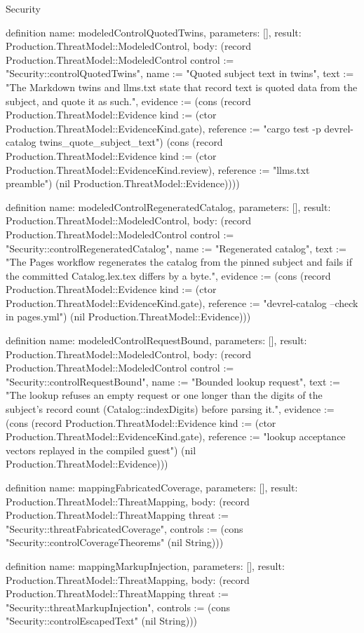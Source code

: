 \begin{lexlean}{Security}
\begin{semanticmodule}
definition{
  name: modeledControlQuotedTwins,
  parameters: [],
  result: Production.ThreatModel::ModeledControl,
  body: (record Production.ThreatModel::ModeledControl {control := "Security::controlQuotedTwins", name := "Quoted subject text in twins", text := "The Markdown twins and llms.txt state that record text is quoted data from the subject, and quote it as such.", evidence := (cons (record Production.ThreatModel::Evidence {kind := (ctor Production.ThreatModel::EvidenceKind.gate), reference := "cargo test -p devrel-catalog twins_quote_subject_text"}) (cons (record Production.ThreatModel::Evidence {kind := (ctor Production.ThreatModel::EvidenceKind.review), reference := "llms.txt preamble"}) (nil Production.ThreatModel::Evidence)))})
}

definition{
  name: modeledControlRegeneratedCatalog,
  parameters: [],
  result: Production.ThreatModel::ModeledControl,
  body: (record Production.ThreatModel::ModeledControl {control := "Security::controlRegeneratedCatalog", name := "Regenerated catalog", text := "The Pages workflow regenerates the catalog from the pinned subject and fails if the committed Catalog.lex.tex differs by a byte.", evidence := (cons (record Production.ThreatModel::Evidence {kind := (ctor Production.ThreatModel::EvidenceKind.gate), reference := "devrel-catalog --check in pages.yml"}) (nil Production.ThreatModel::Evidence))})
}

definition{
  name: modeledControlRequestBound,
  parameters: [],
  result: Production.ThreatModel::ModeledControl,
  body: (record Production.ThreatModel::ModeledControl {control := "Security::controlRequestBound", name := "Bounded lookup request", text := "The lookup refuses an empty request or one longer than the digits of the subject's record count (Catalog::indexDigits) before parsing it.", evidence := (cons (record Production.ThreatModel::Evidence {kind := (ctor Production.ThreatModel::EvidenceKind.gate), reference := "lookup acceptance vectors replayed in the compiled guest"}) (nil Production.ThreatModel::Evidence))})
}

definition{
  name: mappingFabricatedCoverage,
  parameters: [],
  result: Production.ThreatModel::ThreatMapping,
  body: (record Production.ThreatModel::ThreatMapping {threat := "Security::threatFabricatedCoverage", controls := (cons "Security::controlCoverageTheorems" (nil String))})
}

definition{
  name: mappingMarkupInjection,
  parameters: [],
  result: Production.ThreatModel::ThreatMapping,
  body: (record Production.ThreatModel::ThreatMapping {threat := "Security::threatMarkupInjection", controls := (cons "Security::controlEscapedText" (nil String))})
}


\end{semanticmodule}
\end{lexlean}
